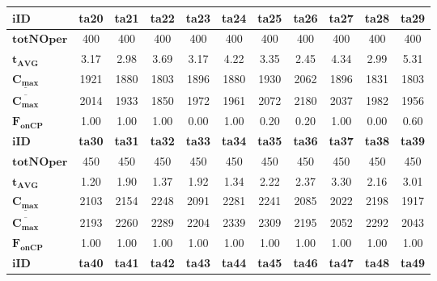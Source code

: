 \documentclass[archivemode]{mgr}
\begin{document}
\begin{table}[!ht]
\renewcommand{\arraystretch}{1.2}
\begin{tabularx}{\textwidth}{|X|c|c|c|c|c|c|c|c|c|c|}
\hline
$\mathbf{iID}$ & \textbf{ta20} & \textbf{ta21} & \textbf{ta22} & \textbf{ta23} & \textbf{ta24} & \textbf{ta25} & \textbf{ta26} & \textbf{ta27} & \textbf{ta28} & \textbf{ta29}\\
\hline
$\mathbf{totNOper}$ & 400 & 400 & 400 & 400 & 400 & 400 & 400 & 400 & 400 & 400\\
\hline
$\mathbf{t_{AVG}}$ & 3.17 & 2.98 & 3.69 & 3.17 & 4.22 & 3.35 & 2.45 & 4.34 & 2.99 & 5.31\\
\hline
$\mathbf{\underline{C_{max}}}$ & 1921 & 1880 & 1803 & 1896 & 1880 & 1930 & 2062 & 1896 & 1831 & 1803\\
\hline
$\mathbf{\overline{C_{max}}}$ & 2014 & 1933 & 1850 & 1972 & 1961 & 2072 & 2180 & 2037 & 1982 & 1956\\
\hline
$\mathbf{F_{onCP}}$ & 1.00 & 1.00 & 1.00 & 0.00 & 1.00 & 0.20 & 0.20 & 1.00 & 0.00 & 0.60\\
\hline
\hline
$\mathbf{iID}$ & \textbf{ta30} & \textbf{ta31} & \textbf{ta32} & \textbf{ta33} & \textbf{ta34} & \textbf{ta35} & \textbf{ta36} & \textbf{ta37} & \textbf{ta38} & \textbf{ta39}\\
\hline
$\mathbf{totNOper}$ & 450 & 450 & 450 & 450 & 450 & 450 & 450 & 450 & 450 & 450\\
\hline
$\mathbf{t_{AVG}}$ & 1.20 & 1.90 & 1.37 & 1.92 & 1.34 & 2.22 & 2.37 & 3.30 & 2.16 & 3.01\\
\hline
$\mathbf{\underline{C_{max}}}$ & 2103 & 2154 & 2248 & 2091 & 2281 & 2241 & 2085 & 2022 & 2198 & 1917\\
\hline
$\mathbf{\overline{C_{max}}}$ & 2193 & 2260 & 2289 & 2204 & 2339 & 2309 & 2195 & 2052 & 2292 & 2043\\
\hline
$\mathbf{F_{onCP}}$ & 1.00 & 1.00 & 1.00 & 1.00 & 1.00 & 1.00 & 1.00 & 1.00 & 1.00 & 1.00\\
\hline
\hline
$\mathbf{iID}$ & \textbf{ta40} & \textbf{ta41} & \textbf{ta42} & \textbf{ta43} & \textbf{ta44} & \textbf{ta45} & \textbf{ta46} & \textbf{ta47} & \textbf{ta48} & \textbf{ta49}\\

\end{tabularx}
\end{table}
\end{document}
